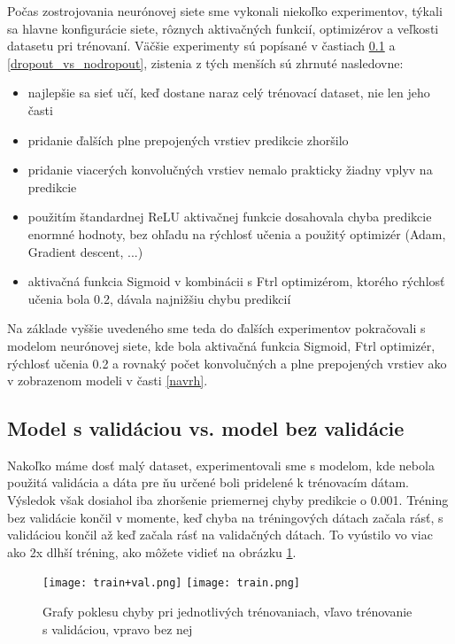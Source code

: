 \fi
\iffalse
Počas zostrojovania neurónovej siete sme vykonali niekoľko experimentov, týkali sa hlavne konfigurácie siete, rôznych aktivačných funkcií, optimizérov a veľkosti datasetu pri trénovaní. Väčšie experimenty sú popísané v častiach \ref{val_vs_noval} a \ref{dropout_vs_nodropout}, zistenia z tých menších sú zhrnuté nasledovne:

\begin{itemize}
	\item najlepšie sa sieť učí, keď dostane naraz celý trénovací dataset, nie len jeho časti
	\item pridanie ďalších plne prepojených vrstiev predikcie zhoršilo
	\item pridanie viacerých konvolučných vrstiev nemalo prakticky žiadny vplyv na predikcie
	\item použitím štandardnej ReLU aktivačnej funkcie dosahovala chyba predikcie enormné hodnoty, bez ohľadu na rýchlosť učenia a použitý optimizér (Adam, Gradient descent, ...)
	\item aktivačná funkcia Sigmoid v kombinácii s Ftrl optimizérom, ktorého rýchlosť učenia bola 0.2, dávala najnižšiu chybu predikcií
\end{itemize}

Na základe vyššie uvedeného sme teda do ďalších experimentov pokračovali s modelom neurónovej siete, kde bola aktivačná funkcia Sigmoid, Ftrl optimizér, rýchlosť učenia 0.2 a rovnaký počet konvolučných a plne prepojených vrstiev ako v zobrazenom modeli v časti \ref{navrh}.

\subsection{Model s validáciou vs. model bez validácie}
\label{val_vs_noval}
Nakoľko máme dosť malý dataset, experimentovali sme s modelom, kde nebola použitá validácia a dáta pre ňu určené boli pridelené k trénovacím dátam. Výsledok však dosiahol iba zhoršenie priemernej chyby predikcie o 0.001. Tréning bez validácie končil v momente, keď chyba na tréningových dátach začala rásť, s validáciou končil až keď začala rásť na validačných dátach. To vyústilo vo viac ako 2x dlhší tréning, ako môžete vidieť na obrázku \ref{validation_graph}. 

	\begin{figure}[H]
			\texttt{[image: train+val.png]}
			\texttt{[image: train.png]}
		\caption[Trénovanie s validáciou vs. trénovanie bez validácie]{Grafy poklesu chyby pri jednotlivých trénovaniach, vľavo trénovanie s validáciou, vpravo bez nej}\label{validation_graph}
	\end{figure}
	
